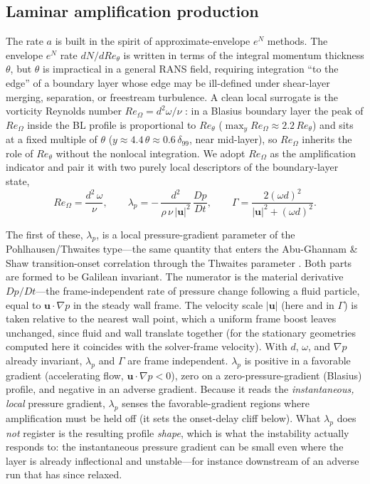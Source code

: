 \documentclass[journal]{new-aiaa}
\begin{document}
\subsection{Laminar amplification production}
The rate $a$ is built in the spirit of approximate-envelope $e^N$ methods. The
envelope $e^N$ rate $dN/dRe_\theta$ is written in terms of the integral
momentum thickness $\theta$, but $\theta$ is impractical in a general RANS field,
requiring integration ``to the edge'' of a boundary layer whose edge may be
ill-defined under shear-layer merging, separation, or freestream turbulence.
A clean local surrogate is the vorticity Reynolds number
$Re_\Omega=d^2\omega/\nu$ \cite{VanDriest1963, MenterLangtry2006, langtry_menter_2009}:
in a Blasius boundary layer the peak of $Re_\Omega$ inside the BL profile is
proportional to $Re_\theta$ ($\max_y Re_\Omega\!\approx\!2.2\,Re_\theta$) and
sits at a fixed multiple of $\theta$
($y\!\approx\!4.4\,\theta\!\approx\!0.6\,\delta_{99}$, near mid-layer), so
$Re_\Omega$ inherits the role of $Re_\theta$ without the nonlocal integration. We adopt $Re_\Omega$ as the
amplification indicator and pair it with two purely local descriptors of the
boundary-layer state,
\begin{equation}
  Re_\Omega = \frac{d^2\,\omega}{\nu}, \qquad
  \lambda_p = -\,\frac{d^{2}}{\rho\,\nu\,|\mathbf{u}|^{2}}\,\frac{Dp}{Dt}, \qquad
  \Gamma = \frac{2(\omega d)^2}{|\mathbf{u}|^2+(\omega d)^2}.
  \label{eq:indicators}
\end{equation}

The first of these, $\lambda_p$, is a local pressure-gradient parameter of the
Pohlhausen/Thwaites type---the same quantity that enters the Abu-Ghannam \& Shaw
transition-onset correlation through the Thwaites parameter
\cite{abu_ghannam_shaw_1980}. Both parts are formed to be Galilean invariant. The
numerator is the material derivative $Dp/Dt$---the frame-independent rate of
pressure change following a fluid particle, equal to $\mathbf{u}\cdot\nabla p$ in
the steady wall frame. The velocity scale $|\mathbf{u}|$ (here and in $\Gamma$) is
taken relative to the nearest wall point, which a uniform frame boost leaves
unchanged, since fluid and wall translate together (for the stationary
geometries computed here it coincides with the solver-frame velocity). With
$d$, $\omega$, and $\nabla p$ already invariant, $\lambda_p$ and $\Gamma$
are frame independent. $\lambda_p$ is positive in a favorable gradient
(accelerating flow, $\mathbf{u}\cdot\nabla p\!<\!0$), zero on a
zero-pressure-gradient (Blasius) profile, and negative in an adverse gradient.
Because it reads the \emph{instantaneous, local} pressure gradient, $\lambda_p$
senses the favorable-gradient regions where amplification
must be held off (it sets the onset-delay cliff below). What
$\lambda_p$ does \emph{not} register is the resulting profile \emph{shape}, which
is what the instability actually responds to: the instantaneous pressure gradient
can be small even where the layer is already inflectional and unstable---for
instance downstream of an adverse run that has since relaxed.
\end{document}
